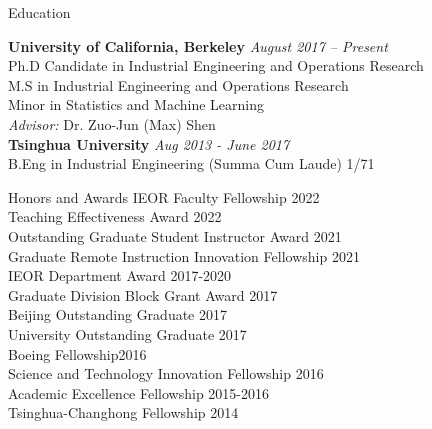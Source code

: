 \documentclass{resume} %
\begin{document}

\begin{rSection}{Education}

{\bf University of California, Berkeley} \hfill {\em August 2017 -- Present} 
\\ Ph.D Candidate in Industrial Engineering and Operations Research \hfill 
\\ M.S in Industrial Engineering and Operations Research
\\ Minor in Statistics and Machine Learning
\\ {\textit{Advisor:} Dr. Zuo-Jun (Max) Shen} 
\\{\bf Tsinghua University} \hfill {\em Aug 2013 - June 2017} 
\\ B.Eng in Industrial Engineering (Summa Cum Laude) \hfill { 1/71 }
\end{rSection}

\begin{rSection}{Honors and Awards}
IEOR Faculty Fellowship \hfill {2022}\\
Teaching Effectiveness Award \hfill {2022}\\
Outstanding Graduate Student Instructor Award \hfill {2021}\\
Graduate Remote Instruction Innovation Fellowship \hfill {2021}\\
IEOR Department Award \hfill {2017-2020}\\
Graduate Division Block Grant Award \hfill {2017}\\
Beijing Outstanding Graduate \hfill {2017}\\
University Outstanding Graduate \hfill {2017}\\
Boeing Fellowship\hfill {2016}\\
Science and Technology Innovation Fellowship \hfill {2016}\\
Academic Excellence Fellowship \hfill {2015-2016}\\
Tsinghua-Changhong Fellowship \hfill{2014}
\end{rSection}
\end{document}
